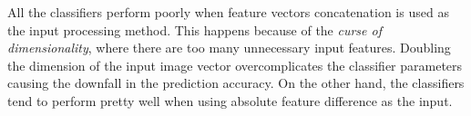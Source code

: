 All the classifiers perform poorly when feature vectors concatenation is used as the input processing method. This happens because of the \emph{curse of dimensionality}, where there are too many unnecessary input features. Doubling the dimension of the input image vector overcomplicates the classifier parameters causing the downfall in the prediction accuracy. On the other hand, the classifiers tend to perform pretty well when using absolute feature difference as the input.

